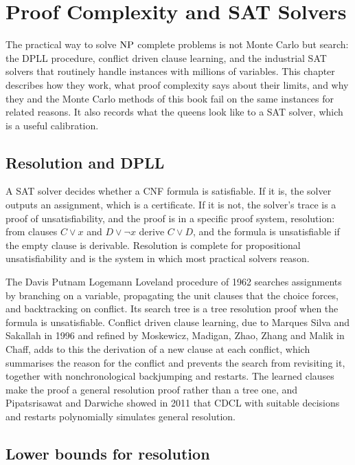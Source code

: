 \chapter{Proof Complexity and SAT Solvers}
\label{ch:proofcomplexity}

The practical way to solve $\mathrm{NP}$ complete problems is not Monte Carlo but search: the DPLL procedure, conflict driven clause learning, and the industrial SAT solvers that routinely handle instances with millions of variables. This chapter describes how they work, what proof complexity says about their limits, and why they and the Monte Carlo methods of this book fail on the same instances for related reasons. It also records what the queens look like to a SAT solver, which is a useful calibration.

\section{Resolution and DPLL}

A SAT solver decides whether a CNF formula is satisfiable. If it is, the solver outputs an assignment, which is a certificate. If it is not, the solver's trace is a proof of unsatisfiability, and the proof is in a specific proof system, resolution: from clauses $C \vee x$ and $D \vee \neg x$ derive $C \vee D$, and the formula is unsatisfiable if the empty clause is derivable. Resolution is complete for propositional unsatisfiability and is the system in which most practical solvers reason.

The Davis Putnam Logemann Loveland procedure of 1962 searches assignments by branching on a variable, propagating the unit clauses that the choice forces, and backtracking on conflict. Its search tree is a tree resolution proof when the formula is unsatisfiable. Conflict driven clause learning, due to Marques Silva and Sakallah in 1996 and refined by Moskewicz, Madigan, Zhao, Zhang and Malik in Chaff, adds to this the derivation of a new clause at each conflict, which summarises the reason for the conflict and prevents the search from revisiting it, together with nonchronological backjumping and restarts. The learned clauses make the proof a general resolution proof rather than a tree one, and Pipatsrisawat and Darwiche showed in 2011 that CDCL with suitable decisions and restarts polynomially simulates general resolution.

\section{Lower bounds for resolution}

